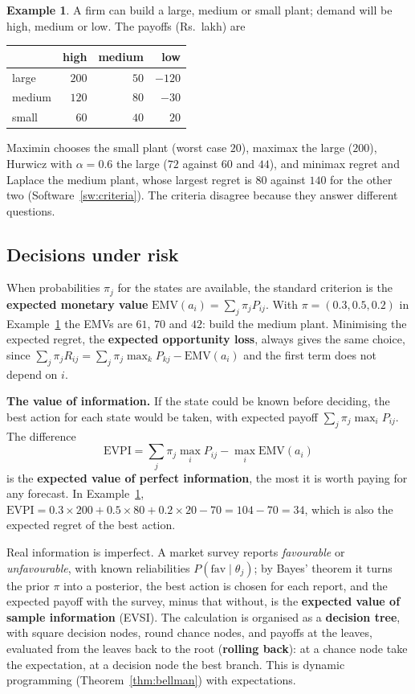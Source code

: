 \documentclass[11pt,a4paper]{article}
\numberwithin{equation}{section}
\theoremstyle{definition}
\newtheorem{exa}[thm]{Example}
\begin{document}
\begin{exa}
\label{ex:plant}
A firm can build a large, medium or small plant; demand will be high, medium or low. The payoffs (Rs.~lakh) are
\begin{center}
\small
\begin{tabular}{l|rrr}
 & high & medium & low \\
\hline
large & $200$ & $50$ & $-120$ \\
medium & $120$ & $80$ & $-30$ \\
small & $60$ & $40$ & $20$
\end{tabular}
\end{center}
Maximin chooses the small plant (worst case $20$), maximax the large ($200$), Hurwicz with $\alpha = 0.6$ the large ($72$ against $60$ and $44$), and minimax regret and Laplace the medium plant, whose largest regret is $80$ against $140$ for the other two (Software~\ref{sw:criteria}). The criteria disagree because they answer different questions.
\end{exa}

\subsection{Decisions under risk}
\label{ssec:risk}

When probabilities $\pi_j$ for the states are available, the standard criterion is the \textbf{expected monetary value} $\text{EMV}(a_i) = \sum_j\pi_jP_{ij}$. With $\pi = (0.3, 0.5, 0.2)$ in Example~\ref{ex:plant} the EMVs are $61$, $70$ and $42$: build the medium plant. Minimising the expected regret, the \textbf{expected opportunity loss}, always gives the same choice,
since $\sum_j\pi_jR_{ij} = \sum_j\pi_j\max_kP_{kj} - \text{EMV}(a_i)$ and the first term does not depend on $i$.

\textbf{The value of information.} If the state could be known before deciding, the best action for each state would be taken, with expected payoff $\sum_j\pi_j\max_iP_{ij}$. The difference
\[
\text{EVPI} = \sum_j\pi_j\max_iP_{ij} - \max_i\text{EMV}(a_i)
\]
is the \textbf{expected value of perfect information}, the most it is worth paying for any forecast. In Example~\ref{ex:plant}, $\text{EVPI} = 0.3 \times 200 + 0.5 \times 80 + 0.2 \times 20 - 70 = 104 - 70 = 34$, which is also the expected regret of the best action.

Real information is imperfect. A market survey reports \emph{favourable} or \emph{unfavourable}, with known reliabilities $P(\text{fav} \mid \theta_j)$; by Bayes' theorem it turns the prior $\pi$ into a posterior, the best action is chosen for each report, and the expected payoff with the survey, minus that without, is the \textbf{expected value of sample information}
(EVSI). The calculation is organised as a \textbf{decision tree}, with square decision nodes, round chance nodes, and payoffs at the leaves, evaluated from the leaves back to the root (\textbf{rolling back}): at a chance node take the expectation, at a decision node the best branch. This is dynamic programming (Theorem~\ref{thm:bellman}) with
expectations.
\end{document}
